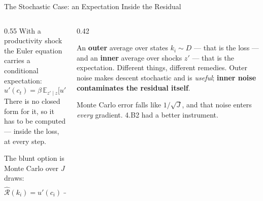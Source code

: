 \begin{frame}{The Stochastic Case: an Expectation Inside the Residual}
\begin{columns}[T]
\begin{column}{0.55\textwidth}
\small
With a productivity shock the Euler equation carries a conditional expectation:
\[
  u'(c_t)=\beta\,\mathbb{E}_{z'\mid z}\!\bigl[u'(c_{t+1})\bigl(\alpha k_{t+1}^{\alpha-1}z'+1-\delta\bigr)\bigr].
\]
There is no closed form for it, so it has to be computed --- inside the loss, at every step.
\medskip

The blunt option is Monte Carlo over $J$ draws:
\[
  \widehat{\mathcal{R}}(k_i)=u'(c_i)-\frac{\beta}{J}\sum_{j=1}^{J}u'(c'_{ij})R'_{ij} .
\]
\end{column}
\begin{column}{0.42\textwidth}
\begin{cautionbox}[title=\textbf{Two layers of sampling}]\small
An \textbf{outer} average over states $k_i\sim D$ --- that is the loss --- and an \textbf{inner} average over shocks $z'$ --- that is the expectation.
\medskip
Different things, different remedies. Outer noise makes descent stochastic and is \emph{useful}; \textbf{inner noise contaminates the residual itself}.
\end{cautionbox}
\smallskip
{\footnotesize Monte Carlo error falls like $1/\sqrt J$, and that noise enters \emph{every} gradient. 4.B2 had a better instrument.}
\end{column}
\end{columns}
\end{frame}

